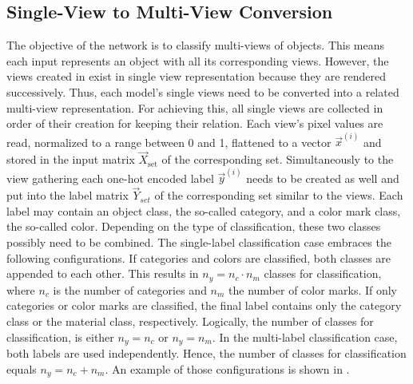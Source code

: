 \subsection{Single-View to Multi-View Conversion}
\label{sec:prepare-data-view-conversion}
The objective of the network is to classify multi-views of objects.
This means each input represents an object with all its corresponding views.
However, the views created in  exist in single view representation because they are rendered successively.
Thus, each model's single views need to be converted into a related multi-view representation.
For achieving this, all single views are collected in order of their creation for keeping their relation.
Each view's pixel values are read, normalized to a range between 0 and 1, flattened to a vector $\vec{x}^{(i)}$ and stored in the input matrix $\vec{X}_{\text{set}}$ of the corresponding set.
Simultaneously to the view gathering each one-hot encoded label $\vec{y}^{(i)}$ needs to be created as well and put into the label matrix $\vec{Y}_{set}$ of the corresponding set similar to the views.
Each label may contain an object class, the so-called category, and a color mark class, the so-called color.
Depending on the type of classification, these two classes possibly need to be combined.
The single-label classification case embraces the following configurations.
If categories and colors are classified, both classes are appended to each other.
This results in $n_y = n_c \cdot n_m$ classes for classification, where $n_c$ is the number of categories and $n_m$ the number of color marks.
If only categories or color marks are classified, the final label contains only the category class or the material class, respectively.
Logically, the number of classes for classification, is either $n_y = n_c$ or $n_y = n_m$.
In the multi-label classification case, both labels are used independently.
Hence, the number of classes for classification equals $n_y = n_c + n_m$.
An example of those configurations is shown in .
